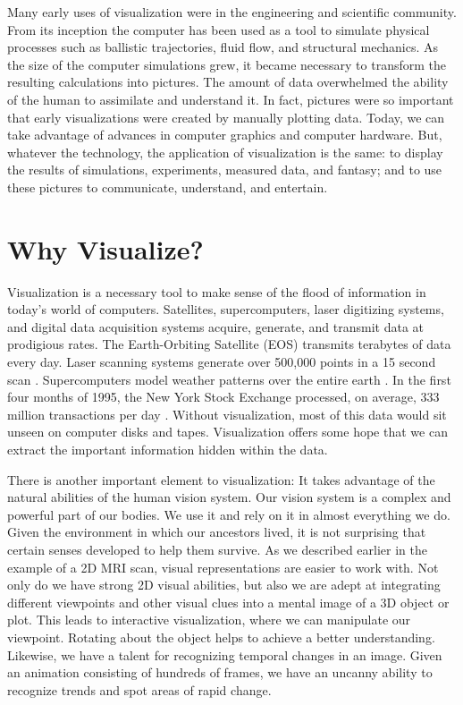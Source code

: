 Many early uses of visualization were in the engineering and scientific community. From its inception the computer has been used as a tool to simulate physical processes such as ballistic trajectories, fluid flow, and structural mechanics. As the size of the computer simulations grew, it became necessary to transform the resulting calculations into pictures. The amount of data overwhelmed the ability of the human to assimilate and understand it. In fact, pictures were so important that early visualizations were created by manually plotting data. Today, we can take advantage of advances in computer graphics and computer hardware. But, whatever the technology, the application of visualization is the same: to display the results of simulations, experiments, measured data, and fantasy; and to use these pictures to communicate, understand, and entertain.

\section{Why Visualize?}

Visualization is a necessary tool to make sense of the flood of information in today's world of computers. Satellites, supercomputers, laser digitizing systems, and digital data acquisition systems acquire, generate, and transmit data at prodigious rates. The Earth-Orbiting Satellite (EOS) transmits terabytes of data every day. Laser scanning systems generate over 500,000 points in a 15 second scan \cite{Waters91}. Supercomputers model weather patterns over the entire earth \cite{Chen93}. In the first four months of 1995, the New York Stock Exchange processed, on average, 333 million transactions per day \cite{NYTimes}. Without visualization, most of this data would sit unseen on computer disks and tapes. Visualization offers some hope that we can extract the important information hidden within the data.

There is another important element to visualization: It takes advantage of the natural abilities of the human vision system. Our vision system is a complex and powerful part of our bodies. We use it and rely on it in almost everything we do. Given the environment in which our ancestors lived, it is not surprising that certain senses developed to help them survive. As we described earlier in the example of a 2D MRI scan, visual representations are easier to work with. Not only do we have strong 2D visual abilities, but also we are adept at integrating different viewpoints and other visual clues into a mental image of a 3D object or plot. This leads to interactive visualization, where we can manipulate our viewpoint. Rotating about the object helps to achieve a better understanding. Likewise, we have a talent for recognizing temporal changes in an image. Given an animation consisting of hundreds of frames, we have an uncanny ability to recognize trends and spot areas of rapid change.

